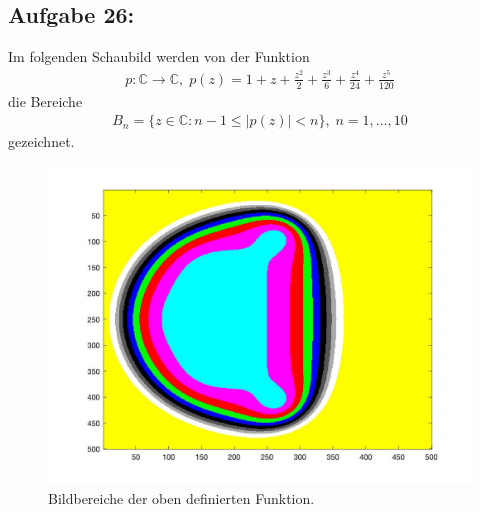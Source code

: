 \documentclass[12pt]{article}
\begin{document}
\subsection*{Aufgabe 26:}
Im folgenden Schaubild werden von der Funktion 
\begin{align*}
p: \mathbb{C} \to \mathbb{C},\; p(z) = 1 + z + \frac{z^2}{2} + \frac{z^3}{6} + \frac{z^4}{24} + \frac{z^5}{120}
\end{align*}
die Bereiche
\begin{align*}
B_n = \{ z \in \mathbb{C}: n-1 \leq |p(z)| < n \}, \; n = 1, \ldots, 10
\end{align*}
gezeichnet.
\begin{figure}[h!]
\centering
\includegraphics[scale=0.4]{pictureExercive9_1}
\caption{Bildbereiche der oben definierten Funktion.}
\end{figure}
\end{document}
